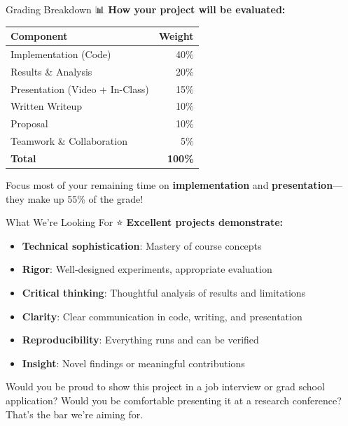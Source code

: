 \documentclass[aspectratio=169]{beamer}
\begin{document}
\begin{frame}{Grading Breakdown 📊}
\textbf{How your project will be evaluated:}

\begin{center}
\begin{tabular}{lr}
\toprule
\textbf{Component} & \textbf{Weight} \\
\midrule
Implementation (Code) & 40\% \\
Results \& Analysis & 20\% \\
Presentation (Video + In-Class) & 15\% \\
Written Writeup & 10\% \\
Proposal & 10\% \\
Teamwork \& Collaboration & 5\% \\
\midrule
\textbf{Total} & \textbf{100\%} \\
\bottomrule
\end{tabular}
\end{center}

\vspace{0.3cm}

\begin{protip}
Focus most of your remaining time on \textbf{implementation} and \textbf{presentation}—they make up 55\% of the grade!
\end{protip}
\end{frame}

\begin{frame}[shrink=10]{What We're Looking For ⭐}
\small
\textbf{Excellent projects demonstrate:}
\begin{itemize}\setlength{\itemsep}{0pt}
    \item \textbf{Technical sophistication}: Mastery of course concepts
    \item \textbf{Rigor}: Well-designed experiments, appropriate evaluation
    \item \textbf{Critical thinking}: Thoughtful analysis of results and limitations
    \item \textbf{Clarity}: Clear communication in code, writing, and presentation
    \item \textbf{Reproducibility}: Everything runs and can be verified
    \item \textbf{Insight}: Novel findings or meaningful contributions
\end{itemize}

\vspace{0.3cm}

\begin{thinkaboutit}
Would you be proud to show this project in a job interview or grad school application? Would you be comfortable presenting it at a research conference? That's the bar we're aiming for.
\end{thinkaboutit}
\end{frame}
\end{document}
